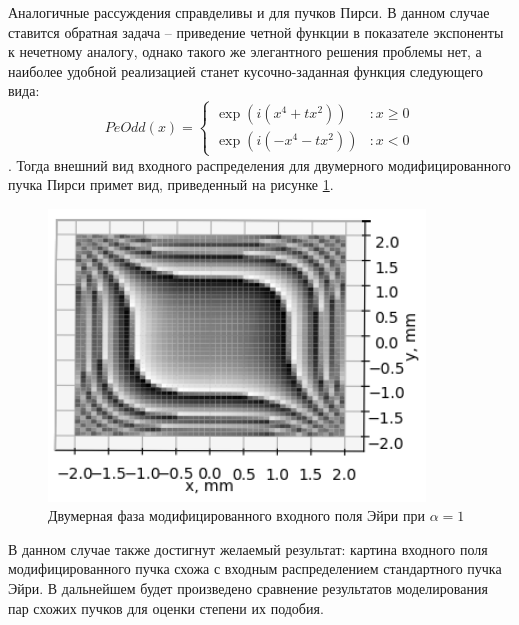{{	Аналогичные рассуждения справделивы и для пучков Пирси. В данном случае  ставится обратная задача -- приведение четной функции в показателе экспоненты к нечетному аналогу, однако такого же элегантного решения проблемы нет, а наиболее удобной реализацией станет кусочно-заданная функция следующего вида:
\[PeOdd(x) = \left\{
  \begin{array}{lr}
    \exp(i(x^4 + tx^2)) & : x \ge 0\\
 	 \exp(i(-x^4 - tx^2)) & : x < 0
  \end{array}
\right.
\].
Тогда внешний вид входного распределения для двумерного модифицированного пучка Пирси примет вид, приведенный на рисунке \ref{peodd_phase_2d}.
\begin{figure}[H]
		  \begin{center}
			\includegraphics[width=10cm]{plots/peoddphase_new}
	\caption{Двумерная фаза модифицированного входного поля Эйри при $\alpha  = 1$}
	\label{peodd_phase_2d}
		 \end{center}
\end{figure}
В данном случае также достигнут желаемый результат: картина входного поля модифицированного пучка схожа с входным распределением стандартного пучка Эйри. В дальнейшем будет произведено сравнение результатов моделирования пар схожих пучков для оценки степени их подобия. 

}
				}
				\newpage

